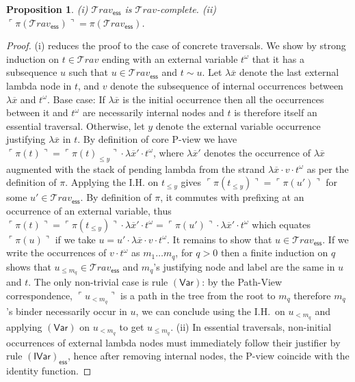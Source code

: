 \documentclass[xchauthor,chkrefs,GCNS,amsmath,amsthm,rotating,leaveRGB]{tcsg}
\theoremstyle{plain}
\newtheorem{proposition}[theorem]{Proposition}
\theoremstyle{definition}
\newcommand\travset{\mathcal{T}\!rav}
\newcommand{\essential}{\mathsf{ess}}
\newcommand{\travsetes}{{\travset_{\essential}}}
\def\coresymbol{\pi}
\newcommand{\core}[1]{\coresymbol(#1)}
\begin{document}
\begin{proposition}\label{prop:essential_traversal_simcomplete}
(i) $\travsetes $ is $\mathcal {T}\!rav$-complete. (ii) $\ulcorner  \core
{\travsetes  } \urcorner   = \core{\travsetes }$.
\end{proposition}

\begin{proof}
(i)  reduces the proof to
the case of concrete traversals. We show by strong induction on $t\in
\mathcal {T}\!rav$ ending with an external variable $t^\omega $ that it has a
subsequence $u$ such that $u\in \travsetes $ and $t \sim u$. Let $\lambda
\overline{x}$ denote the last external lambda node in $t$, and $v$ denote the
subsequence of internal occurrences between $\lambda \overline{x}$ and
$t^\omega $. Base case: If $\lambda \overline{x}$ is the initial occurrence
then all the occurrences between it and $t^\omega $ are necessarily internal
nodes and $t$ is therefore itself an essential traversal. Otherwise, let $y$
denote the external variable occurrence justifying $\lambda \overline{x}$ in
$t$. By definition of core P-view we have $\ulcorner  \core {t} \urcorner   =
\ulcorner  \core {t}_{\leq  y} \urcorner   \cdot \lambda \overline{x}' \cdot
t^\omega $, where $\lambda \overline{x}'$ denotes the occurrence of $\lambda
\overline{x}$ augmented with the stack of pending lambda from the strand
$\lambda \overline{x} \cdot v \cdot t^\omega $ as per the definition of
$\coresymbol $. Applying the I.H. on $t_{\leq y}$ gives $\ulcorner  \core
{t_{\leq  y}} \urcorner   = \ulcorner  \core {u'} \urcorner  $ for some $u'
\in \travsetes $. By definition of $\coresymbol $, it commutes with prefixing
at an occurrence of an external variable, thus $\ulcorner  \core {t}
\urcorner = \ulcorner  \core {t_{\leq  y}} \urcorner   \cdot \lambda
\overline{x}' \cdot t^\omega = \ulcorner  \core {u'} \urcorner   \cdot
\lambda \overline{x}' \cdot t^\omega $ which equates $\ulcorner  \core {u}
\urcorner  $ if we take $u = u' \cdot \lambda \overline{x} \cdot v \cdot
t^\omega $. It remains to show that $u\in \travsetes $. If we write the
occurrences of $ v \cdot t^\omega $ as $m_{1} \ldots m_{q}$, for $q>0$ then a
finite induction on $q$ shows that $u_{\leq m_{q}} \in \travsetes $ and
$m_{q}$'s justifying node and label are the same in $u$ and $t$. The only
non-trivial case is rule $\mathsf{(Var)}$: by the Path-View correspondence,
$\ulcorner  u_{<m_{q}} \urcorner  $ is a path in the tree from the root to
$m_{q}$ therefore $m_{q}$'s binder necessarily occur in $u$, we can  conclude
using the I.H.~on $u_{<m_{q}}$ and applying $\mathsf{(Var)}$ on $u_{<m_{q}}$
to get $u_{\leq m_{q}}$. (ii) In essential traversals, non-initial
occurrences of external lambda nodes must immediately follow their justifier
by rule $\mathsf{(IVar)}_{\essential} $, hence after removing internal nodes,
the P-view coincide with the identity function.
\end{proof}
\end{document}
